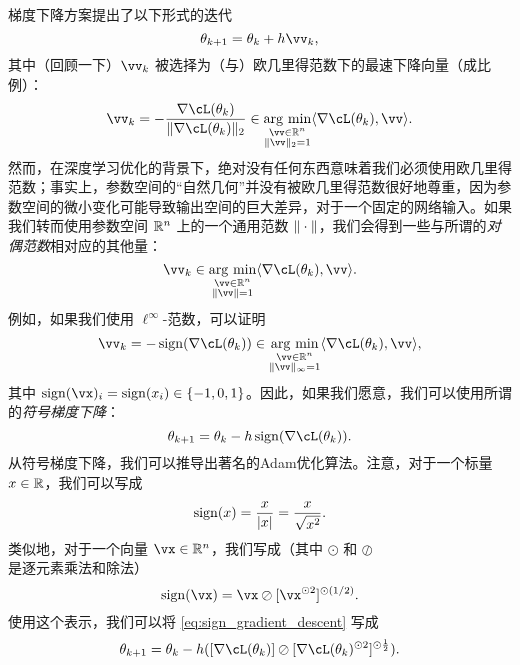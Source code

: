 \documentclass[../../book-main_zh.tex]{subfiles}
\begin{document}
梯度下降方案提出了以下形式的迭代
\begin{equation}
    \theta_{k + 1} = \theta_{k} + h\vv_{k},
\end{equation}
其中（回顾一下）\(\vv_{k}\) 被选择为（与）欧几里得范数下的最速下降向量（成比例）：
\begin{equation}
    \vv_{k} = -\frac{\nabla \cL(\theta_{k})}{\norm{\nabla \cL(\theta_{k})}_{2}} \in \argmin_{\substack{\vv \in \R^{n} \\ \norm{\vv}_{2} = 1}}\ip{\nabla \cL(\theta_{k})}{\vv}.
\end{equation}
然而，在深度学习优化的背景下，绝对没有任何东西意味着我们必须使用欧几里得范数；事实上，参数空间的“自然几何”并没有被欧几里得范数很好地尊重，因为参数空间的微小变化可能导致输出空间的巨大差异，对于一个固定的网络输入。如果我们转而使用参数空间 \(\mathbb{R}^{n}\) 上的一个通用范数 \(\norm{\cdot}\)，我们会得到一些与所谓的\textit{对偶范数}相对应的其他量：
\begin{equation}
    \vv_{k} \in \argmin_{\substack{\vv \in \R^{n} \\ \norm{\vv} = 1}}\ip{\nabla \cL(\theta_{k})}{\vv}.
\end{equation}
例如，如果我们使用 \(\ell^{\infty}\)-范数，可以证明
\begin{equation}
    \vv_{k} = -\sign(\nabla \cL(\theta_{k})) \in \argmin_{\substack{\vv \in \R^{n} \\ \norm{\vv}_{\infty} = 1}}\ip{\nabla \cL(\theta_{k})}{\vv},
\end{equation}
其中 \(\sign(\vx)_{i} = \sign(x_{i}) \in \{-1, 0, 1\}\)。因此，如果我们愿意，我们可以使用所谓的\textit{符号梯度下降}：
\begin{equation}\label{eq:sign_gradient_descent}
    \theta_{k + 1} = \theta_{k} - h\sign(\nabla \cL(\theta_{k})).
\end{equation}
从符号梯度下降，我们可以推导出著名的Adam优化算法。注意，对于一个标量 \(x \in \mathbb{R}\)，我们可以写成
\begin{equation}
    \sign(x) = \frac{x}{\abs{x}} = \frac{x}{\sqrt{x^{2}}}.
\end{equation}
类似地，对于一个向量 \(\vx \in \R^{n}\)，我们写成（其中 \(\odot\) 和 \(\oslash\) 是逐元素乘法和除法）
\begin{equation}
    \sign(\vx) = \vx \oslash [\vx^{\odot 2}]^{\odot (1/2)}.
\end{equation}
使用这个表示，我们可以将 \eqref{eq:sign_gradient_descent} 写成
\begin{equation}
    \theta_{k + 1} = \theta_{k} - h ([\nabla \cL(\theta_{k})] \oslash [\nabla \cL(\theta_{k})^{\odot 2}]^{\odot \frac{1}{2}}).
\end{equation}
\end{document}
